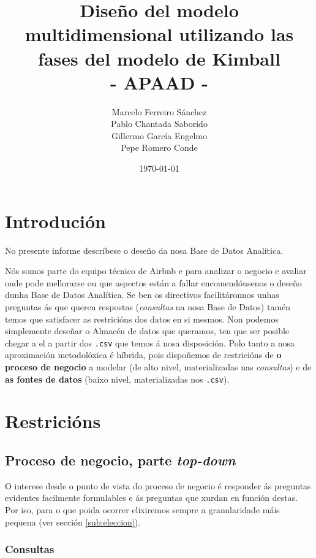 \documentclass[12pt,a4paper]{article}
\title{Diseño del modelo multidimensional utilizando las fases del modelo de Kimball\\
\large - APAAD - }
\author{Marcelo Ferreiro Sánchez\\ Pablo Chantada Saborido \\ Gillermo García Engelmo \\Pepe Romero Conde}
\date{\today}
\begin{document}
\maketitle

\tableofcontents

\newpage

\section{Introdución}

No presente informe descríbese o deseño da nosa Base de Datos Analítica.

Nós somos parte do equipo técnico de Airbnb e para analizar o negocio e avaliar onde pode mellorarse ou que aspectos están a fallar encomendóusenos o deseño dunha Base de Datos Analítica. Se ben os directivos facilitáronnos unhas preguntas ás que queren respostas (\emph{consultas} na nosa Base de Datos) tamén temos que satisfacer as restricións dos datos en si mesmos. Non podemos simplemente deseñar o Almacén de datos que queramos, ten que ser posible chegar a el a partir dos \texttt{.csv} que temos á nosa disposición. Polo tanto a nosa aproximación metodolóxica é híbrida, pois dispoñemos de restricións de \textbf{o proceso de negocio} a modelar (de alto nivel, materializadas nas \emph{consultas}) e de \textbf{as fontes de datos} (baixo nivel, materializadas nos \texttt{.csv}).


\section{Restricións}
\subsection{Proceso de negocio, parte \emph{top-down}}

O interese desde o punto de vista do proceso de negocio é responder ás preguntas evidentes facilmente formulables e ás preguntas que xurdan en función destas. Por iso, para o que poida ocorrer elixiremos sempre a granularidade máis pequena (ver sección \ref{sub:eleccion}). 

\subsubsection{Consultas}
\end{document}
